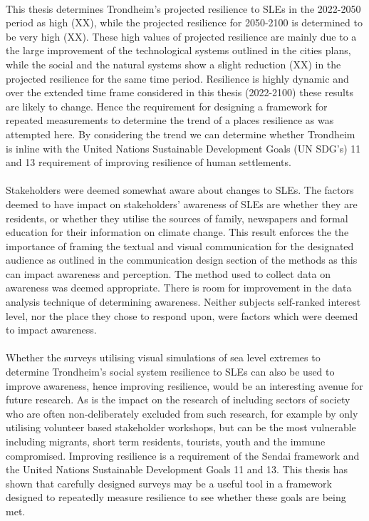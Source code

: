 \paragraph{}
This thesis determines Trondheim's projected resilience to SLEs in the 2022-2050 period as high (XX), while the projected resilience for 2050-2100 is determined to be very high (XX). These high values of projected resilience are mainly due to a the large improvement of the technological systems outlined in the cities plans, while the social and the natural systems show a slight reduction (XX) in the projected resilience for the same time period. Resilience is highly dynamic and over the extended time frame considered in this thesis (2022-2100) these results are likely to change. Hence the requirement for designing a framework for repeated measurements to determine the trend of a places resilience as was attempted here. By considering the trend we can determine whether Trondheim is inline with the United Nations Sustainable Development Goals (UN SDG’s) 11 and 13 requirement of improving resilience of human settlements.

\paragraph{}
Stakeholders were deemed somewhat aware about changes to SLEs. The factors deemed to have impact on stakeholders' awareness of SLEs are whether they are residents, or whether they utilise the sources of family, newspapers and formal education for their information on climate change. This result enforces the the importance of framing the textual and visual communication for the designated audience as outlined in the communication design section of the methods as this can impact awareness and perception.  The method used to collect data on awareness was deemed appropriate. There is room for improvement in the data analysis technique of determining awareness. Neither subjects self-ranked interest level, nor the place they chose to respond upon, were factors which were deemed to impact awareness.
\paragraph{}



Whether the surveys utilising visual simulations of sea level extremes to determine Trondheim's social system resilience to SLEs can also be used to improve awareness, hence improving resilience, would be an interesting avenue for future research. As is the impact on the research of including sectors of society who are often non-deliberately excluded from such research, for example by only utilising volunteer based stakeholder workshops, but can be the most vulnerable including migrants, short term residents, tourists, youth and the immune compromised. Improving resilience is a requirement of the Sendai framework and the United Nations Sustainable Development Goals 11 and 13. This thesis has shown that carefully designed surveys may be a useful tool in a framework designed to repeatedly measure resilience to see whether these goals are being met.


